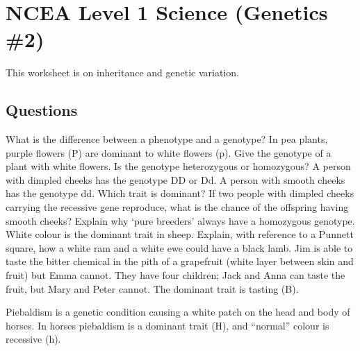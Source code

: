 \documentclass{exam}
\begin{document}
\section*{NCEA Level 1 Science (Genetics \#2)}

This worksheet is on inheritance and genetic variation.

\subsection*{Questions}
\begin{questions}
  \question What is the difference between a phenotype and a genotype?
  \question In pea plants, purple flowers (P) are dominant to white flowers (p). Give the genotype of
            a plant with white flowers. Is the genotype heterozygous or homozygous?
  \question A person with dimpled cheeks has the genotype DD or Dd. A person with smooth cheeks has the genotype dd. Which
            trait is dominant? If two people with dimpled cheeks carrying the recessive gene reproduce, what is the chance of
            the offspring having smooth cheeks?
  \question Explain why `pure breeders' always have a homozygous genotype.
  \question White colour is the dominant trait in sheep. Explain, with reference to a Punnett square, how a white ram and a
            white ewe could have a black lamb.
  \question Jim is able to taste the bitter chemical in the pith of a grapefruit (white layer between skin and fruit) but Emma
            cannot. They have four children; Jack and Anna can taste the fruit, but Mary and Peter cannot. The dominant trait
            is tasting (B).
  \question {[NZQA 2017]} Piebaldism is a genetic condition causing a white patch on the head and body of horses. In horses 
            piebaldism is a dominant trait (H), and ``normal'' colour is recessive (h).
            

\end{questions}
\end{document}
